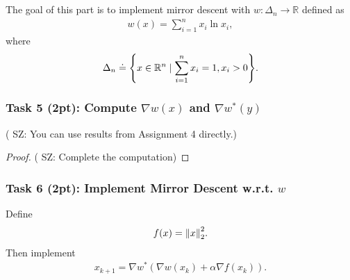 \documentclass[11pt]{article}
\newcommand{\sz}[1]{({\color{blue} {SZ: #1}})}
\newcommand{\R}{\mathbb{R}}
\begin{document}
\part{}

The goal of this part is to implement mirror descent with $w: \Delta_n \to \R$ defined as
\begin{align}
  w(x) = \sum_{i=1}^n x_i \ln x_i,
\end{align}
where 
\begin{align}
  \Delta_n \doteq \qty{ x \in \R^n \mid \sum_{i=1}^n x_i = 1, x_i > 0}.
\end{align}

\section*{Task 5 (2pt): Compute $\nabla w(x)$ and $\nabla w^*(y)$}
\sz{You can use results from Assignment 4 directly.}
\begin{proof}
  \sz{Complete the computation}
\end{proof}


\section*{Task 6 (2pt): Implement Mirror Descent w.r.t. $w$}
Define 
\begin{align}
  f(x) = \norm{x}^2_2.
\end{align}
Then implement
\begin{align}
  x_{k+1} = \nabla w^*\left(\nabla w(x_k) + \alpha \nabla f(x_k)\right).
\end{align}
\end{document}
